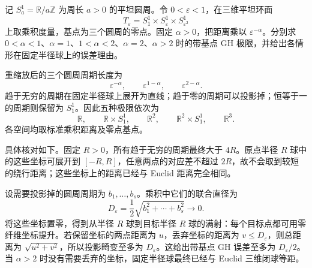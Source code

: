 \begin{exercise}\label{g3:ex:three-scale-flat-tori}
	记 \(S^1_a=\mathbb R/a\mathbb Z\) 为周长 \(a>0\) 的平坦圆周。令 \(0<\varepsilon<1\)，在三维平坦环面
	\[
		T_\varepsilon=S^1_1\times S^1_\varepsilon\times S^1_{\varepsilon^2}
	\]
	上取乘积度量，基点为三个圆周的零点。固定 \(\alpha>0\)，把距离乘以 \(\varepsilon^{-\alpha}\)。分别求
	\(0<\alpha<1\)、\(\alpha=1\)、\(1<\alpha<2\)、\(\alpha=2\)、\(\alpha>2\)
	时的带基点 GH 极限，并给出各情形在固定半径球上的误差理由。
\end{exercise}
\begin{solution}
	重缩放后的三个圆周周期长度为
	\[
		\varepsilon^{-\alpha},\qquad
		\varepsilon^{1-\alpha},\qquad
		\varepsilon^{2-\alpha}.
	\]
	趋于无穷的周期在固定半径球上展开为直线；趋于零的周期可以投影掉；恒等于一的周期则保留为 \(S^1_1\)。因此五种极限依次为
	\[
		\mathbb R,\qquad
		\mathbb R\times S^1_1,\qquad
		\mathbb R^2,\qquad
		\mathbb R^2\times S^1_1,\qquad
		\mathbb R^3.
	\]
	各空间均取标准乘积距离及零点基点。

	具体核对如下。固定 \(R>0\)，所有趋于无穷的周期最终大于 \(4R\)。原点半径 \(R\) 球中的这些坐标可展开到 \([-R,R]\)，任意两点的对应差不超过 \(2R\)，故不会取到较短的绕行距离；这些坐标上的距离已经与 Euclid 距离完全相同。

	设需要投影掉的圆周周期为 \(b_1,\ldots,b_s\)。乘积中它们的联合直径为
	\[
		D_\varepsilon=\frac12\sqrt{b_1^2+\cdots+b_s^2}\longrightarrow0.
	\]
	将这些坐标置零，得到从半径 \(R\) 球到目标半径 \(R\) 球的满射：每个目标点都可用零纤维坐标提升。若保留坐标的两点距离为 \(u\)，丢弃坐标的距离为 \(v\le D_\varepsilon\)，则总距离为 \(\sqrt{u^2+v^2}\)，所以投影畸变至多为 \(D_\varepsilon\)。这给出带基点 GH 误差至多为 \(D_\varepsilon/2\)。当 \(\alpha>2\) 时没有需要丢弃的坐标，固定半径球最终已经与 Euclid 三维闭球等距。
\end{solution}

